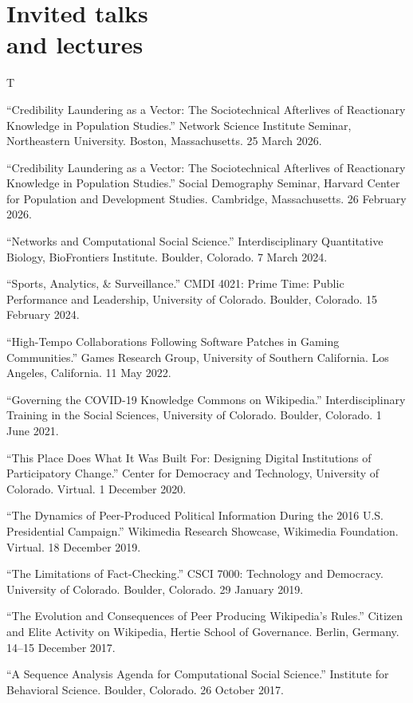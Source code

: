 \documentclass{cv}
\begin{document}
	\section{Invited talks\\and lectures}
	\begin{entries}{T}
		\item ``Credibility Laundering as a Vector: The Sociotechnical Afterlives of Reactionary Knowledge in Population Studies.'' Network Science Institute Seminar, Northeastern University. Boston, Massachusetts. 25 March 2026.
		\item ``Credibility Laundering as a Vector: The Sociotechnical Afterlives of Reactionary Knowledge in Population Studies.'' Social Demography Seminar, Harvard Center for Population and Development Studies. Cambridge, Massachusetts. 26 February 2026.
		\item ``Networks and Computational Social Science.'' Interdisciplinary Quantitative Biology, Bio\-Fron\-tiers Institute. Boulder, Colorado. 7 March 2024.
		\item ``Sports, Analytics, \& Surveillance.'' CMDI 4021: Prime Time: Public Performance and Leadership, University of Colorado. Boulder, Colorado. 15 February 2024.
		\item ``High-Tempo Collaborations Following Software Patches in Gaming Communities.'' Games Research Group, University of Southern California. Los Angeles, California. 11 May 2022.
		\item ``Governing the COVID-19 Knowledge Commons on Wikipedia.'' Interdisciplinary Training in the Social Sciences, University of Colorado. Boulder, Colorado. 1 June 2021.
		\item ``This Place Does What It Was Built For: Designing Digital Institutions of Participatory Change.'' Center for Democracy and Technology, University of Colorado. Virtual. 1 December 2020.
		\item ``The Dynamics of Peer-Produced Political Information During the 2016 U.S. Presidential Campaign.'' Wikimedia Research Showcase, Wikimedia Foundation. Virtual. 18 December 2019.
		\item ``The Limitations of Fact-Checking.'' CSCI 7000: Technology and Democracy. University of Colorado. Boulder, Colorado. 29 January 2019.
		\item ``The Evolution and Consequences of Peer Producing Wikipedia's Rules.'' Citizen and Elite Activity on Wikipedia, Hertie School of Governance. Berlin, Germany. 14--15 December 2017.
		\item ``A Sequence Analysis Agenda for Computational Social Science.'' Institute for Behavioral Science. Boulder, Colorado. 26 October 2017.

\end{entries}
\end{document}
